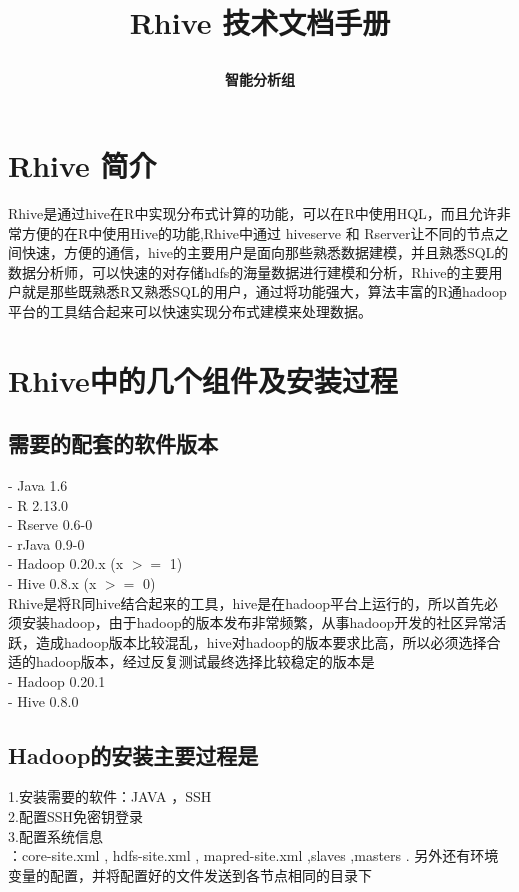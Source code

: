 \documentclass[12pt]{article}
\title{
\begin{CJK*}{UTF8}{gbsn}
\textbf{Rhive 技术文档手册}
\end{CJK*}
}
\author{ 
\begin{CJK*}{UTF8}{gbsn}
\textbf{智能分析组}
\end{CJK*}
}
\begin{document}
\maketitle





\begin{CJK*}{UTF8}{gbsn}
\section{Rhive 简介}
Rhive是通过hive在R中实现分布式计算的功能，可以在R中使用HQL，而且允许非常方便的在R中使用Hive的功能,Rhive中通过 hiveserve 和 Rserver让不同的节点之间快速，方便的通信，hive的主要用户是面向那些熟悉数据建模，并且熟悉SQL的数据分析师，可以快速的对存储hdfs的海量数据进行建模和分析，Rhive的主要用户就是那些既熟悉R又熟悉SQL的用户，通过将功能强大，算法丰富的R通hadoop平台的工具结合起来可以快速实现分布式建模来处理数据。
\section{Rhive中的几个组件及安装过程}
\subsection{需要的配套的软件版本 }
\indent - Java 1.6  \\
\indent - R 2.13.0 \\
\indent - Rserve 0.6-0 \\
\indent - rJava 0.9-0 \\
\indent - Hadoop 0.20.x (x $>=$ 1) \\
\indent - Hive 0.8.x (x $>=$ 0)\\
Rhive是将R同hive结合起来的工具，hive是在hadoop平台上运行的，所以首先必须安装hadoop，由于hadoop的版本发布非常频繁，从事hadoop开发的社区异常活跃，造成hadoop版本比较混乱，hive对hadoop的版本要求比高，所以必须选择合适的hadoop版本，经过反复测试最终选择比较稳定的版本是  \\
\indent - Hadoop 0.20.1 \\
\indent - Hive 0.8.0  
\subsection{Hadoop的安装主要过程是}
1.安装需要的软件：JAVA ，SSH \\
2.配置SSH免密钥登录  \\
3.配置系统信息  \\
：core-site.xml , hdfs-site.xml ,
mapred-site.xml ,slaves ,masters . 
另外还有环境变量的配置，并将配置好的文件发送到各节点相同的目录下

\end{CJK*}
\end{document}
